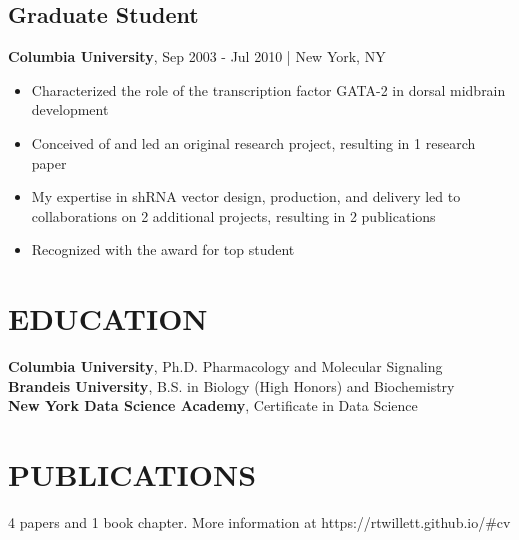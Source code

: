 \documentclass[11pt]{article}
\newenvironment{myitemize}
{ \begin{itemize}
	\setlength{\itemsep}{0pt}
	\setlength{\parskip}{0pt}
	\setlength{\parsep}{0pt}     }
{ \end{itemize}                  }
\begin{document}
\subsection*{Graduate Student}
\vspace{-3truemm}
{\bfseries Columbia University}, Sep 2003 - Jul 2010 | New York, NY
\begin{myitemize}
	\item Characterized the role of the transcription factor GATA-2 in dorsal midbrain development
	\item Conceived of and led an original research project, resulting in 1 research paper
	\item My expertise in shRNA vector design, production, and delivery led to collaborations on 2 additional projects, resulting in 2 publications
	\item Recognized with the award for top student
\end{myitemize}

\section*{EDUCATION}
\vspace{-3truemm}
{\bfseries Columbia University}, Ph.D. Pharmacology and Molecular Signaling \\
{\bfseries Brandeis University}, B.S. in Biology (High Honors) and Biochemistry \\
{\bfseries New York Data Science Academy}, Certificate in Data Science

\section*{PUBLICATIONS}
\vspace{-3truemm}
4 papers and 1 book chapter. More information at https://rtwillett.github.io/\#cv
\end{document}
